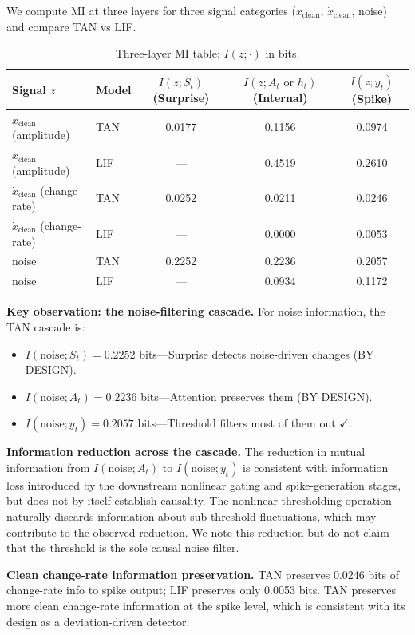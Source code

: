 We compute MI at three layers for three signal categories ($x_{\text{clean}}$, $\dot{x}_{\text{clean}}$, noise) and compare TAN vs LIF.

\begin{table}[h]
\centering\small
\caption{Three-layer MI table: $I(z; \cdot)$ in bits.}
\begin{tabular}{llccc}
\toprule
Signal $z$ & Model & $I(z; S_t)$ (Surprise) & $I(z; A_t \text{ or } h_t)$ (Internal) & $I(z; y_t)$ (Spike) \\
\midrule
$x_{\text{clean}}$ (amplitude) & TAN & 0.0177 & 0.1156 & 0.0974 \\
$x_{\text{clean}}$ (amplitude) & LIF & --- & 0.4519 & 0.2610 \\
$\dot{x}_{\text{clean}}$ (change-rate) & TAN & 0.0252 & 0.0211 & 0.0246 \\
$\dot{x}_{\text{clean}}$ (change-rate) & LIF & --- & 0.0000 & 0.0053 \\
noise & TAN & 0.2252 & 0.2236 & 0.2057 \\
noise & LIF & --- & 0.0934 & 0.1172 \\
\bottomrule
\end{tabular}
\end{table}

\textbf{Key observation: the noise-filtering cascade.} For noise information, the TAN cascade is:
\begin{itemize}
    \item $I(\text{noise}; S_t) = 0.2252$ bits---Surprise detects noise-driven changes (BY DESIGN).
    \item $I(\text{noise}; A_t) = 0.2236$ bits---Attention preserves them (BY DESIGN).
    \item $I(\text{noise}; y_t) = 0.2057$ bits---Threshold filters most of them out $\checkmark$.
\end{itemize}

\textbf{Information reduction across the cascade.} The reduction in mutual information from $I(\text{noise}; A_t)$ to $I(\text{noise}; y_t)$ is consistent with information loss introduced by the downstream nonlinear gating and spike-generation stages, but does not by itself establish causality. The nonlinear thresholding operation naturally discards information about sub-threshold fluctuations, which may contribute to the observed reduction. We note this reduction but do not claim that the threshold is the sole causal noise filter.

\textbf{Clean change-rate information preservation.} TAN preserves 0.0246 bits of change-rate info to spike output; LIF preserves only 0.0053 bits. TAN preserves more clean change-rate information at the spike level, which is consistent with its design as a deviation-driven detector.


